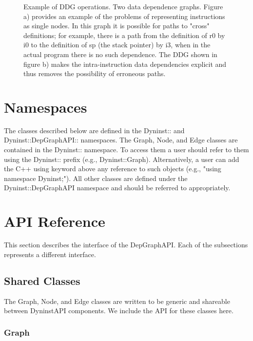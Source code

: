 \documentclass[12pt,titlepage]{article}
\begin{document}
\begin{figure}\label{Operations}
\begin{center}
\caption{Example of DDG operations.  Two data dependence
graphs. Figure a) provides an example of the problems of representing
instructions as single nodes. In this graph it is possible for paths
to "cross" definitions; for example, there is a path from the
definition of r0 by i0 to the definition of sp (the stack pointer) by
i3, when in the actual program there is no such dependence. The DDG
shown in figure b) makes the intra-instruction data dependencies
explicit and thus removes the possibility of erroneous paths.}
\end{center}
\end{figure}

\section{Namespaces}

The classes described below are defined in the Dyninst:: and
Dyninst::DepGraphAPI:: namespaces. The Graph, Node, and Edge classes
are contained in the Dyninst:: namespace.  To access them a user
should refer to them using the Dyninst:: prefix (e.g.,
Dyninst::Graph). Alternatively, a user can add the C++ using keyword
above any reference to such objects (e.g., "using namespace
Dyninst;"). All other classes are defined under the
Dyninst::DepGraphAPI namespace and should be referred to
appropriately.

\section{API Reference}

This section describes the interface of the DepGraphAPI. Each of the
subsections represents a different interface.
        
\subsection{Shared Classes}

The Graph, Node, and Edge classes are written to be generic and
shareable between DyninstAPI components. We include the API for these
classes here.

\subsubsection{Graph}
\end{document}
